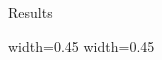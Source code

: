 \begin{frame} 
\begin{center}
 \Huge Results
\end{center}

\end{frame}


\begin{frame}
   \begin{multicols}{2}
      {width=0.45\textwidth} {}
      {width=0.45\textwidth} {}
   \end{multicols}
\end{frame}
\begin{frame}
   \begin{multicols}{2}
      {}
      {}
   \end{multicols}

	
\end{frame}
\begin{frame}
   \begin{multicols}{2}
      {}
      {}
   \end{multicols}

	
\end{frame}
\begin{frame}
   \begin{multicols}{2}
      {}
      {}
   \end{multicols}

	
\end{frame}
\begin{frame}
   \begin{multicols}{2}
      {}
      {}
   \end{multicols}

	
\end{frame}
